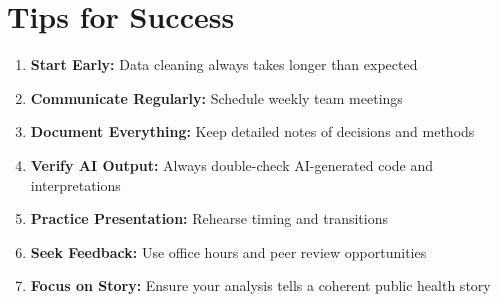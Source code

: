 \documentclass[11pt]{article}
\begin{document}
\section{Tips for Success}

\begin{enumerate}
\item \textbf{Start Early:} Data cleaning always takes longer than expected
\item \textbf{Communicate Regularly:} Schedule weekly team meetings
\item \textbf{Document Everything:} Keep detailed notes of decisions and methods
\item \textbf{Verify AI Output:} Always double-check AI-generated code and interpretations
\item \textbf{Practice Presentation:} Rehearse timing and transitions
\item \textbf{Seek Feedback:} Use office hours and peer review opportunities
\item \textbf{Focus on Story:} Ensure your analysis tells a coherent public health story
\end{enumerate}
\end{document}
